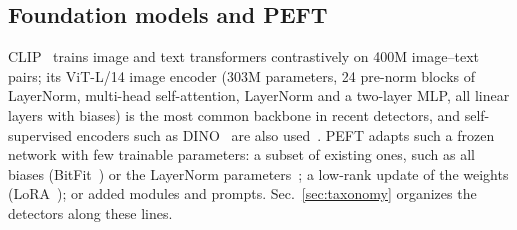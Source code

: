 \documentclass[fonts]{icst}
\begin{document}
\begin{table}[!t]
\centering
\caption{Datasets. Test videos are those of the official test splits used in our benchmark (real + fake).}
\label{tab:data}
\footnotesize
{}
\end{table}

\subsection{Foundation models and PEFT}
CLIP~\cite{radford2021clip_vitl} trains image and text transformers contrastively on 400M image--text pairs; its ViT-L/14 image encoder (303M parameters, 24 pre-norm blocks of LayerNorm, multi-head self-attention, LayerNorm and a two-layer MLP, all linear layers with biases) is the most common backbone in recent detectors, and self-supervised encoders such as DINO~\cite{caron2021emerging} are also used~\cite{zhang2026dino,zou2026clipdino}. PEFT adapts such a frozen network with few trainable parameters: a subset of existing ones, such as all biases (BitFit~\cite{benzaken2022bitfit}) or the LayerNorm parameters~\cite{wang2022ln,giannou2023layernorm,valizadeh2024layernorm}; a low-rank update of the weights (LoRA~\cite{hu2022lora}); or added modules and prompts. Sec.~\ref{sec:taxonomy} organizes the detectors along these lines.

\end{document}

